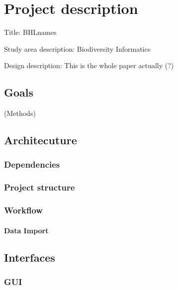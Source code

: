\documentclass[
]{article}
\begin{document}
\hypertarget{project-description}{%
\section{Project description}\label{project-description}}

Title: BHLnames

Study area description: Biodiversity Informatics

Design description: This is the whole paper actually (?)

\hypertarget{goals}{%
\subsection{Goals}\label{goals}}

(Methods)

\hypertarget{architecuture}{%
\subsection{Architecuture}\label{architecuture}}

\hypertarget{dependencies}{%
\subsubsection{Dependencies}\label{dependencies}}

\hypertarget{project-structure}{%
\subsubsection{Project structure}\label{project-structure}}

\hypertarget{workflow}{%
\subsubsection{Workflow}\label{workflow}}

\hypertarget{data-import}{%
\paragraph{Data Import}\label{data-import}}

\hypertarget{interfaces}{%
\subsection{Interfaces}\label{interfaces}}

\hypertarget{gui}{%
\subsubsection{GUI}\label{gui}}
\end{document}
